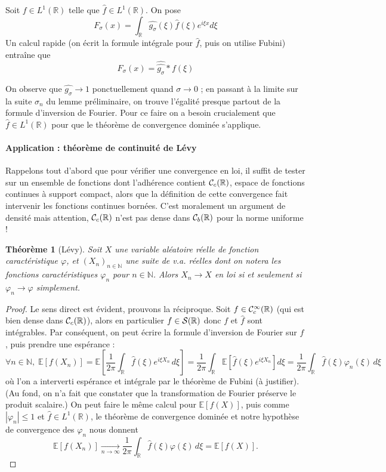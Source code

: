 \documentclass[a4paper, 11pt]{article}
\def\N{\mathbb{N}}
\def\R{\mathbb{R}}
\def\S{{\cal{S}}}
\def\Cf{{\cal{C}}}
\def\E{\mathbb{E}}
\newtheorem*{theorem}{Théorème}
\begin{document}
Soit $f \in L^1(\R)$ telle que $\hat{f} \in L^1(\R)$. On pose
\[ F_\sigma(x) = \int_\R \widehat{g_\sigma}(\xi)\hat{f}(\xi)e^{i\xi x} d\xi \]
Un calcul rapide (on écrit la formule intégrale pour $\hat{f}$, puis on utilise
Fubini) entraîne que
\[ F_\sigma(x) = \widehat{\widehat{g_\sigma}} * f(\xi) \]

On observe que $\widehat{g_\sigma} \longrightarrow 1$ ponctuellement quand
$\sigma \to 0$ ; en passant à la limite sur la suite $\sigma_n$ du lemme
préliminaire, on trouve l'égalité presque partout de la formule d'inversion de
Fourier. Pour ce faire on a besoin crucialement que $\hat{f} \in L^1(\R)$ pour
que le théorème de convergence dominée s'applique.

\paragraph{Application : théorème de continuité de Lévy} Rappelons tout d'abord
que pour vérifier une convergence en loi, il suffit de tester sur un ensemble de
fonctions dont l'adhérence contient $\Cf_c(\R)$, espace de fonctions continues
à support compact, alors que la définition de cette convergence fait intervenir
les fonctions continues bornées. C'est moralement un argument de densité mais
attention, $\Cf_c(\R)$ n'est pas dense dans $\Cf_b(\R)$ pour la norme uniforme !

\begin{theorem}[Lévy]
  Soit $X$ une variable aléatoire réelle de fonction caractéristique $\varphi$, et
  $(X_n)_{n \in \N}$ une suite de v.a. réelles dont on notera les fonctions
  caractéristiques $\varphi_n$ pour $n \in \N$. Alors $X_n \rightarrow X$ en loi si
  et seulement si $\varphi_n \rightarrow \varphi$ simplement.
\end{theorem}
\begin{proof}
  Le sens direct est évident, prouvons la réciproque. Soit $f \in
  \Cf^\infty_c(\R)$ (qui est bien dense dans $\Cf_c(\R)$), alors en particulier
  $f \in \S(\R)$ donc $f$ et $\hat{f}$ sont intégrables. Par conséquent, on peut
  écrire la formule d'inversion de Fourier sur $f$, puis prendre une espérance :
  \[ \forall n \in \N,\; \E[ f(X_n) ] = 
    \E\left[ \frac{1}{2\pi} \int_\R \hat{f}(\xi) e^{i\xi X_n}\,d\xi \right] =
    \frac{1}{2\pi} \int_\R \E\left[ \hat{f}(\xi) e^{i\xi X_n} \right] d\xi =
    \frac{1}{2\pi} \int_\R \hat{f}(\xi) \varphi_n(\xi)\, d\xi
  \]
  où l'on a interverti espérance et intégrale par le théorème de Fubini (à
  justifier). (Au fond, on n'a fait que constater que la transformation de
  Fourier préserve le produit scalaire.) On peut faire le même calcul pour
  $\E[f(X)]$, puis comme $|\varphi_n| \leq 1$ et $\hat{f} \in L^1(\R)$, le théorème
  de convergence dominée et notre  hypothèse de convergence des $\varphi_n$ nous
  donnent
  \[ \E[ f(X_n) ] \underset{n \to \infty}{\longrightarrow}
    \frac{1}{2\pi} \int_\R \hat{f}(\xi) \varphi(\xi)\, d\xi = \E[f(X)].  \]
\end{proof}
\end{document}
